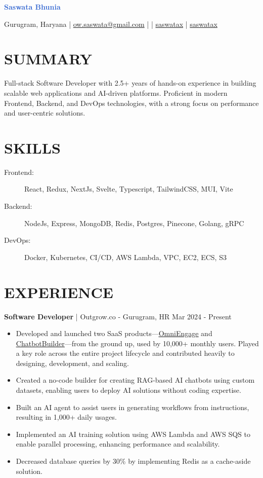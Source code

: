\documentclass[]{resume}
\begin{document}
\textrm{\Huge\textcolor{highlight}{\textbf{Saswata Bhunia}}}
\vspace{.3em}

Gurugram, Haryana | \href{mailto:ow.saswata@gmail.com}{\faEnvelope \space ow.saswata@gmail.com} | \href{tel:7872055339}{\faPhone {}} | \href{https://www.linkedin.com/in/saswatax}{\faLinkedin \space saswatax} | \href{https://github.com/saswatax}{\faGithub \space saswatax}
\vspace{.4em}

\section{SUMMARY}
Full-stack Software Developer with 2.5+ years of hands-on experience in building scalable web applications and AI-driven platforms. Proficient in modern Frontend, Backend, and DevOps technologies, with a strong focus on performance and user-centric solutions.

\section{SKILLS}
\begin{description}
    \item[Frontend:] React, Redux, NextJs, Svelte, Typescript, TailwindCSS, MUI, Vite
    \item[Backend:] NodeJs, Express, MongoDB, Redis, Postgres, Pinecone, Golang, gRPC
    \item[DevOps:] Docker, Kubernetes, CI/CD, AWS Lambda, VPC, EC2, ECS, S3
\end{description}

\section{EXPERIENCE}
\textbf{Software Developer} | Outgrow.co - Gurugram, HR \hfill Mar 2024 - Present
\begin{itemize}
    \item Developed and launched two SaaS products—\uline{\href{https://omniengage.co}{OmniEngage}} and \uline{\href{https://chatbotbuilder.net/}{ChatbotBuilder}}—from the ground up, used by 10,000+ monthly users. Played a key role across the entire project lifecycle and contributed heavily to designing, development, and scaling.
    \item Created a no-code builder for creating RAG-based AI chatbots using custom datasets, enabling users to deploy AI solutions without coding expertise.
    \item Built an AI agent to assist users in generating workflows from instructions, resulting in 1,000+ daily usages.
    \item Implemented an AI training solution using AWS Lambda and AWS SQS to enable parallel processing, enhancing performance and scalability.
    \item Decreased database queries by 30\% by implementing Redis as a cache-aside solution.
\end{itemize}
\vspace{.6em}
\end{document}
